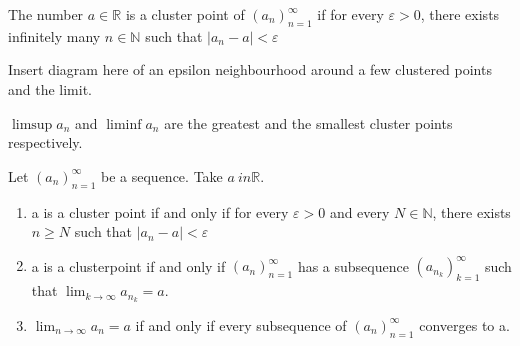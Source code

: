 \begin{definition}
    The number \(a \in \mathbb R\) is a cluster point of \(\left(a_n\right)_{n=1}^\infty\) if for every \(\varepsilon > 0\), there exists infinitely many \(n \in \mathbb N\) such that \(|a_n - a| < \varepsilon\)
\end{definition}
Insert diagram here of an epsilon neighbourhood around a few clustered points and the limit.\\
\begin{note}
    \(\displaystyle\limsup a_n\) and \(\displaystyle\liminf a_n\) are the greatest and the smallest cluster points respectively.
\end{note}
\begin{theorem}
    Let \(\left(a_n\right)_{n=1}^\infty\) be a sequence. Take \(a \ in \mathbb R\).\\
    \begin{enumerate}
        \item a is a cluster point if and only if for every \(\varepsilon > 0\) and every \(N \in \mathbb N\), there exists \(n \ge N\) such that \(|a_n - a| < \varepsilon\)\\
        \item a is a clusterpoint if and only if \(\left(a_n\right)_{n=1}^\infty\) has a subsequence \(\left(a_{n_k}\right)_{k=1}^\infty\) such that \(\displaystyle\lim_{k\to \infty} a_{n_k} = a\).\\
        \item \(\displaystyle\lim_{n\to\infty} a_n = a\) if and only if every subsequence of \(\left(a_n\right)_{n=1}^\infty\) converges to a.\\
    \end{enumerate}
\end{theorem}
